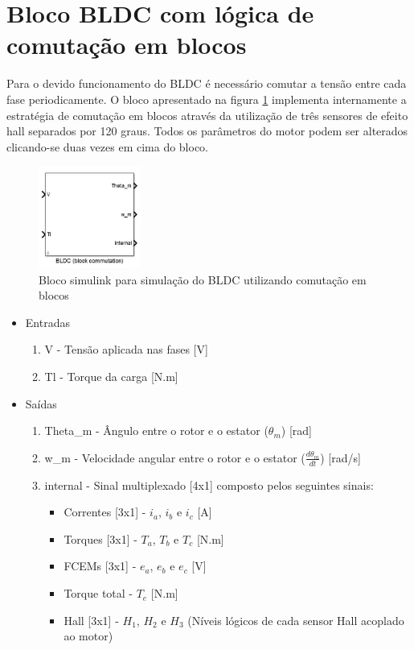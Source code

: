     \section{Bloco BLDC com lógica de comutação em blocos}
        Para o devido funcionamento do BLDC é necessário comutar a tensão entre cada fase periodicamente. O bloco apresentado na figura \ref{fig:bloco_BLDC_block_commutation} implementa internamente a estratégia de comutação em blocos através da utilização de três sensores de efeito hall separados por 120 graus. Todos os parâmetros do motor podem ser alterados clicando-se duas vezes em cima do bloco.
        \begin{figure}[ht]
            \centering
            \includegraphics[width=0.3\textwidth]{bloco_BLDC_block_commutation}
            \caption{Bloco simulink para simulação do BLDC utilizando comutação em blocos}
            \label{fig:bloco_BLDC_block_commutation}
        \end{figure}

        \begin{itemize}
            \item Entradas
            \begin{enumerate}
                \item V - Tensão aplicada nas fases [V]
                \item Tl - Torque da carga [N.m]
            \end{enumerate}
            \item Saídas
            \begin{enumerate}
                \item Theta\_m - Ângulo entre o rotor e o estator ($\theta_m$) [rad]
                \item w\_m - Velocidade angular entre o rotor e o estator ($\frac{d\theta_m}{dt}$) [rad/s]
                \item internal - Sinal multiplexado [4x1] composto pelos seguintes sinais:
                \begin{itemize}
                    \item Correntes [3x1] - $i_a$, $i_b$ e $i_c$ [A]
                    \item Torques [3x1] - $T_a$, $T_b$ e $T_c$ [N.m]
                    \item FCEMs [3x1] - $e_a$, $e_b$ e $e_c$ [V]
                    \item Torque total - $T_e$ [N.m]
                    \item Hall [3x1] - $H_1$, $H_2$ e $H_3$ (Níveis lógicos de cada sensor Hall acoplado ao motor)
                \end{itemize}
            \end{enumerate}
        \end{itemize}

